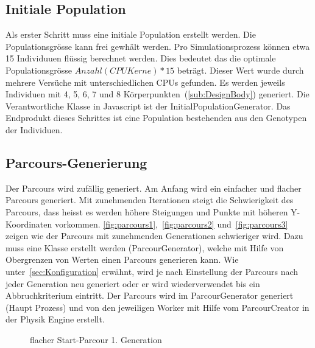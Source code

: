     \subsection{Initiale Population\label{sec:Initiale Polulation}}

      Als erster Schritt muss eine initiale Population erstellt werden. Die Populationsgrösse kann frei gewhält werden.
      Pro Simulationsprozess können etwa 15 Individuuen flüssig berechnet werden.
      Dies bedeutet das die optimale Populationsgrösse  \( Anzahl(CPU Kerne) * 15 \) beträgt.
      Dieser Wert wurde durch mehrere Versüche mit unterschiedlichen CPUs gefunden.
      Es werden jeweils Individuen mit 4, 5, 6, 7 und 8 Körperpunkten~(\vref{sub:DesignBody}) generiert.
      Die Verantwortliche Klasse in Javascript ist der InitialPopulationGenerator.
      Das Endprodukt dieses Schrittes ist eine Population bestehenden aus den Genotypen der Individuen.

    \subsection{Parcours-Generierung\label{sec:Parcour Generierung}}

      Der Parcours wird zufällig generiert. Am Anfang wird ein einfacher und flacher Parcours generiert.
      Mit zunehmenden Iterationen steigt die Schwierigkeit des Parcours,
      dass heisst es werden höhere Steigungen und Punkte mit höheren Y-Koordinaten vorkommen.
      \vref{fig:parcours1},~\vref{fig:parcours2} und~\vref{fig:parcours3} zeigen wie der Parcours mit zunehmenden Generationen schwieriger wird.
      Dazu muss eine Klasse erstellt werden (ParcourGenerator),
      welche mit Hilfe von Obergrenzen von Werten einen Parcours generieren kann.
      Wie unter~\ref{sec:Konfiguration} erwähnt,
      wird je nach Einstellung der Parcours nach jeder Generation neu generiert oder er wird wiederverwendet
      bis ein Abbruchkriterium eintritt.
      Der Parcours wird im ParcourGenerator generiert (Haupt Prozess) und
      von den jeweiligen Worker mit Hilfe vom ParcourCreator in der Physik Engine erstellt.

      \vspace{1cm}

      \begin{figure}[H]
        \centering
        
        \caption{flacher Start-Parcour 1. Generation\label{fig:parcours1}}
      \end{figure}

